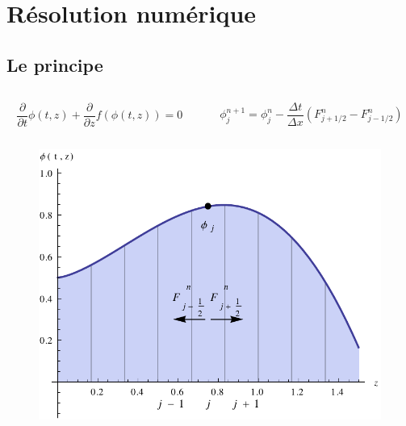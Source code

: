 \documentclass[xcolor=dvipsnames]{beamer}
\newcommand{\p}[2]{\ensuremath{\frac{\partial {#1}}{\partial {#2}}}}
\begin{document}
\section{Résolution numérique}
\subsection{Le principe}
\begin{frame}

\begin{columns}

\begin{column}{6cm}

\[
		\p{}{t} \phi(t,z) + \p{}{z} f(\phi(t,z)) = 0
\]

\end{column}

\begin{column}{6cm}

\[
		\phi^{n+1}_j = \phi^n_j - \frac{\Delta t}{\Delta x} \left( F^n_{j+1/2}  - F^n_{j-1/2} \right) 
\]
\end{column}

\end{columns}

\begin{figure}[htp]
\centering
\includegraphics[scale=0.60]{img/conservative.pdf}
\label{}
\end{figure}

\end{frame}
\end{document}
